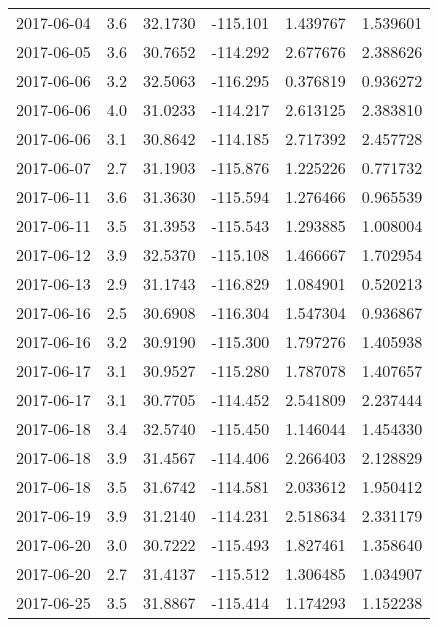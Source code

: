 \begin{tabular}{lrrrrr}
2017-06-04 &       3.6 &  32.1730 &  -115.101 &         1.439767 &         1.539601 \\
2017-06-05 &       3.6 &  30.7652 &  -114.292 &         2.677676 &         2.388626 \\
2017-06-06 &       3.2 &  32.5063 &  -116.295 &         0.376819 &         0.936272 \\
2017-06-06 &       4.0 &  31.0233 &  -114.217 &         2.613125 &         2.383810 \\
2017-06-06 &       3.1 &  30.8642 &  -114.185 &         2.717392 &         2.457728 \\
2017-06-07 &       2.7 &  31.1903 &  -115.876 &         1.225226 &         0.771732 \\
2017-06-11 &       3.6 &  31.3630 &  -115.594 &         1.276466 &         0.965539 \\
2017-06-11 &       3.5 &  31.3953 &  -115.543 &         1.293885 &         1.008004 \\
2017-06-12 &       3.9 &  32.5370 &  -115.108 &         1.466667 &         1.702954 \\
2017-06-13 &       2.9 &  31.1743 &  -116.829 &         1.084901 &         0.520213 \\
2017-06-16 &       2.5 &  30.6908 &  -116.304 &         1.547304 &         0.936867 \\
2017-06-16 &       3.2 &  30.9190 &  -115.300 &         1.797276 &         1.405938 \\
2017-06-17 &       3.1 &  30.9527 &  -115.280 &         1.787078 &         1.407657 \\
2017-06-17 &       3.1 &  30.7705 &  -114.452 &         2.541809 &         2.237444 \\
2017-06-18 &       3.4 &  32.5740 &  -115.450 &         1.146044 &         1.454330 \\
2017-06-18 &       3.9 &  31.4567 &  -114.406 &         2.266403 &         2.128829 \\
2017-06-18 &       3.5 &  31.6742 &  -114.581 &         2.033612 &         1.950412 \\
2017-06-19 &       3.9 &  31.2140 &  -114.231 &         2.518634 &         2.331179 \\
2017-06-20 &       3.0 &  30.7222 &  -115.493 &         1.827461 &         1.358640 \\
2017-06-20 &       2.7 &  31.4137 &  -115.512 &         1.306485 &         1.034907 \\
2017-06-25 &       3.5 &  31.8867 &  -115.414 &         1.174293 &         1.152238 \\

\end{tabular}
